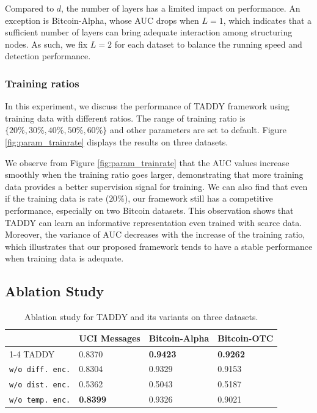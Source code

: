 \documentclass[10pt,journal,compsoc]{IEEEtran}
\newcommand{\HL}{}
\begin{document}
Compared to $d$, the number of layers has a limited impact on performance. An exception is Bitcoin-Alpha, whose AUC drops when $L=1$, which indicates that a sufficient number of layers can bring adequate interaction among structuring nodes. As such, we fix $L=2$ for each dataset to balance the running speed and detection performance. 

\subsubsection{Training ratios} \label{subsubsec: param_trainrate}

In this experiment, we discuss the performance of TADDY framework using training data with different ratios. The range of training ratio is $\{20\%, 30\%, 40\%, 50\%, 60\%\}$ and other parameters are set to default. Figure \ref{fig:param_trainrate} displays the results on three datasets. 

We observe from Figure \ref{fig:param_trainrate} that the AUC \HL{values increase} smoothly when the training ratio goes larger, demonstrating that more training data provides a better supervision signal for training. We can also find that even if the training data is rate ($20\%$), our framework still has a competitive performance, especially on two Bitcoin datasets. This observation shows that TADDY can learn an informative representation even trained with scarce data. Moreover, the variance of AUC decreases with the increase of the training ratio, which illustrates that our proposed framework tends to have a stable performance when training data is adequate.

\subsection{Ablation Study}

\begin{table}[!t]
	\small
	\centering
	\caption{Ablation study for TADDY and its variants on three datasets.}
	\begin{tabular}{ p{80 pt}|p{40 pt}<{\centering}p{40 pt}<{\centering}p{40 pt}<{\centering}}    
		\toprule[1.0pt]
		  & {UCI Messages} & {Bitcoin-Alpha} & {Bitcoin-OTC} \\
		\cmidrule{1-4}
		TADDY                        & 0.8370 & \bf{0.9423} & \bf{0.9262}\\		
		\texttt{w/o diff. enc.}               & 0.8304 & 0.9329 & 0.9153\\
		\texttt{w/o dist. enc.}               & 0.5362 & 0.5043 & 0.5187\\
        \texttt{w/o temp. enc.}               & \bf{0.8399} & 0.9326 & 0.9021\\
		\bottomrule[1.0pt]
	\end{tabular}
	\label{table:ablation}
\end{table}
\end{document}
